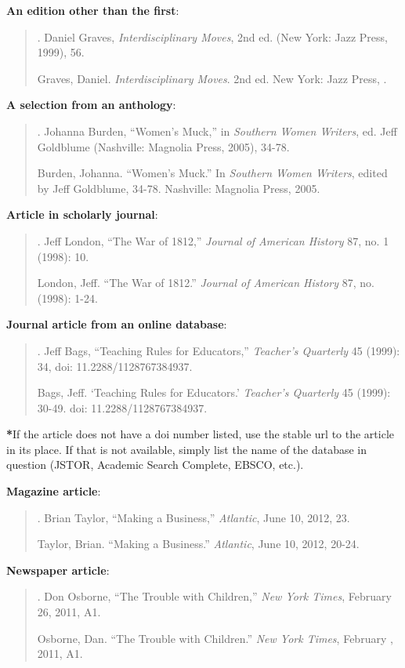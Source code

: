 \textbf{An edition other than the first}:

\begin{quote}
. Daniel Graves, \emph{Interdisciplinary Moves}, 2nd ed. (New York: Jazz Press, 1999), 56.

Graves, Daniel. \emph{Interdisciplinary Moves}. 2nd ed. New York: Jazz Press, .
\end{quote}

\textbf{A selection from an anthology}:
\begin{quote}

. Johanna Burden, ``Women's Muck,'' in \emph{Southern Women Writers}, ed. Jeff Goldblume (Nashville: Magnolia Press, 2005), 34-78.

Burden, Johanna. ``Women's Muck.'' In \emph{Southern Women Writers}, \tab edited by Jeff Goldblume, 
34-78. Nashville: Magnolia Press, 2005.
\end{quote}

\textbf{Article in scholarly journal}:
\begin{quote}
. Jeff London, ``The War of 1812,'' \emph{Journal of American History} 87, no. 1 (1998): 10.

London, Jeff. ``The War of 1812.'' \emph{Journal of American History} 87, no.  (1998): 1-24.
\end{quote}

\textbf{Journal article from an online database}:
\begin{quote}

. Jeff Bags, ``Teaching Rules for Educators,'' \emph{Teacher's Quarterly} 45 (1999): 34, doi: 11.2288/1128767384937.

Bags, Jeff. `Teaching Rules for Educators.' \emph{Teacher's Quarterly} 45 \tab (1999): 30-49. doi: 11.2288/1128767384937.
\end{quote}

\textbf{*}If the article does not have a doi number listed, use the stable url to the article in its place. If that is not available, simply list the name of the database in question (JSTOR, Academic Search Complete, EBSCO, etc.).


\textbf{Magazine article}:
\begin{quote}
. Brian Taylor, ``Making a Business,'' \emph{Atlantic}, June 10, 2012, 23.

Taylor, Brian. ``Making a Business.'' \emph{Atlantic}, June 10, 2012, 20-24.
\end{quote}


\textbf{Newspaper article}:
\begin{quote}
. Don Osborne, ``The Trouble with Children,'' \emph{New York Times}, February 26, 2011, A1.

Osborne, Dan. ``The Trouble with Children.'' \emph{New York Times}, February , 2011, A1.
\end{quote}

